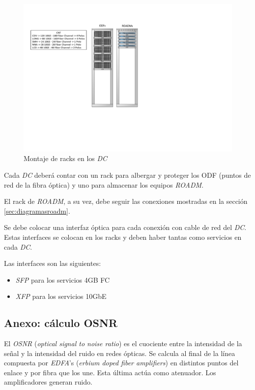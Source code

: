 \begin{figure}[H]
  \centering
  \includegraphics[width=12cm]{Imagenes/racks3.pdf}
  \caption{Montaje de racks en los \emph{DC}}
  \label{fig:racks}
\end{figure}

Cada \emph{DC} deberá contar con un rack para albergar y proteger los
ODF (puntos de red de la fibra óptica) y uno para almacenar los
equipos \emph{ROADM}.

El rack de \emph{ROADM}, a su vez, debe seguir las conexiones
mostradas en la sección \ref{sec:diagramasroadm}.

Se debe colocar una interfaz óptica para cada conexión con cable de
red del \emph{DC}. Estas interfaces se colocan en los racks y deben haber
tantas como servicios en cada \emph{DC}.

Las interfaces son las siguientes:
\begin{itemize}
\item \emph{SFP} para los servicios 4GB FC
\item \emph{XFP} para los servicios 10GbE
\end{itemize}

\subsection{Anexo: cálculo OSNR}
\label{sec:osnr}

El \emph{OSNR} (\emph{optical signal to noise ratio}) es el cuociente
entre la intensidad de la señal y la intensidad del ruido en redes
ópticas. Se calcula al final de la línea compuesta por \emph{EDFA}'s
(\emph{erbium doped fiber amplifiers}) en distintos puntos del enlace
y por fibra que los une. Esta última actúa como atenuador. Los
amplificadores generan ruido.

